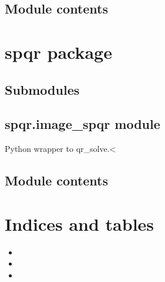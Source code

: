 \documentclass[letterpaper,10pt,english]{sphinxmanual}
\begin{document}
\section{Module contents}
\label{\detokenize{ler:module-contents}}\label{\detokenize{ler:module-ler}}

\chapter{spqr package}
\label{\detokenize{spqr::doc}}\label{\detokenize{spqr:spqr-package}}

\section{Submodules}
\label{\detokenize{spqr:submodules}}

\section{spqr.image\_spqr module}
\label{\detokenize{spqr:spqr-image-spqr-module}}\label{\detokenize{spqr:module-spqr.image_spqr}}

\begin{fulllineitems}
\label{\detokenize{spqr:spqr.image_spqr.main}}
\end{fulllineitems}


\begin{fulllineitems}
\label{\detokenize{spqr:spqr.image_spqr.qr_solve}}
Python wrapper to qr\_solve.\textless{}

\end{fulllineitems}



\section{Module contents}
\label{\detokenize{spqr:module-contents}}\label{\detokenize{spqr:module-spqr}}

\chapter{Indices and tables}
\label{\detokenize{index:indices-and-tables}}\begin{itemize}
\item {} 

\item {} 

\item {} 

\end{itemize}
\end{document}
